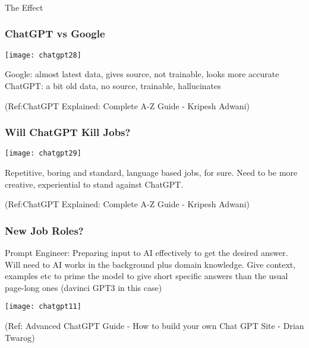 \begin{frame}[fragile]\frametitle{}
\begin{center}
{\Large The Effect}
\end{center}
\end{frame}



\begin{frame}[fragile]\frametitle{ChatGPT vs Google}


\begin{center}
\texttt{[image: chatgpt28]}
\end{center}		

Google: almost latest data, gives source, not trainable, looks more accurate
ChatGPT: a bit old data, no source, trainable, hallucinates

\tiny{(Ref:ChatGPT Explained: Complete A-Z Guide - Kripesh Adwani)}
\end{frame}


\begin{frame}[fragile]\frametitle{Will ChatGPT Kill Jobs?}


\begin{center}
\texttt{[image: chatgpt29]}
\end{center}		

Repetitive, boring and standard, language based jobs, for sure.
Need to be more creative, experiential to stand against ChatGPT.

\tiny{(Ref:ChatGPT Explained: Complete A-Z Guide - Kripesh Adwani)}
\end{frame}


\begin{frame}[fragile]\frametitle{New Job Roles?}
Prompt Engineer: Preparing input to AI effectively to get the desired answer. Will need to AI works in the background plus domain knowledge. Give context, examples etc to prime the model to give short specific answers than the usual page-long ones (davinci GPT3 in this case)

			\begin{center}
			\texttt{[image: chatgpt11]}
			
			\end{center}		
			
			{\tiny (Ref: Advanced ChatGPT Guide - How to build your own Chat GPT Site - Drian Twarog)}
			

\end{frame}

